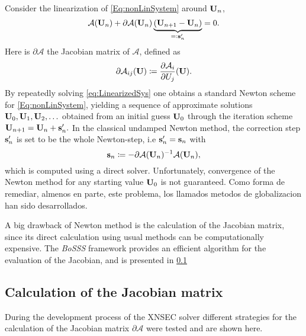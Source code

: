 Consider the linearization of \cref{Eq:nonLinSystem} around $\textbf{U}_n$,
\begin{equation}
	\mathcal{A}(\textbf{U}_{n}) +
	\partial \mathcal{A} (\textbf{U}_n) \underbrace{ ( \textbf{U}_{n+1} -  \textbf{U}_{n} ) }_{=: \textbf{s}'_n }
	= 0.
	\label{eq:LinearizedSys}
\end{equation}
Here is $\partial \mathcal{A}$ the Jacobian matrix of $\mathcal{A}$, defined as
\begin{equation}
	\partial \mathcal{A}_{ij}(\textbf{U}) \coloneqq \frac{\partial \mathcal{A}_i}{\partial U_j}(\textbf{U}).
	\label{Eq:Jacobian}
\end{equation}
By repeatedly solving \cref{eq:LinearizedSys} one obtains a standard Newton scheme for \cref{Eq:nonLinSystem}, yielding a sequence of approximate solutions $\textbf{U}_0, \textbf{U}_1, \textbf{U}_2, \ldots$ obtained from an initial guess $\textbf{U}_0$ through the iteration scheme $ \textbf{U}_{n+1} =\textbf{U}_n + \textbf{s}'_n.$
In the classical undamped Newton method, the correction step $\textbf{s}'_n$ is set to be the whole Newton-step, i.e  $\textbf{s}'_n = \textbf{s}_n$ with
\begin{equation}
	\textbf{s}_n  \coloneqq - \partial \mathcal{A}(\textbf{U}_n)^{-1}\mathcal{A}(\textbf{U}_n),
	\label{eq:NewtonStep}
\end{equation}
which is computed using a direct solver.
Unfortunately, convergence of the Newton method for any starting value $\textbf{U}_0$ is not guaranteed. Como forma de remediar, almenos en parte, este problema, los llamados metodos de globalizacion han sido desarrollados. 

A big drawback of Newton method is the calculation of the Jacobian matrix, since its direct calculation using usual methods can be computationally expensive. The \textit{BoSSS} framework provides an efficient algorithm for the evaluation of the Jacobian, and is presented in \cref{ssec:EvalJacobian}


\subsection{Calculation of the Jacobian matrix} \label{ssec:EvalJacobian}
During the development process of the XNSEC solver different strategies for the calculation of the Jacobian matrix $\partial \mathcal{A}$ were tested and are shown here. 

